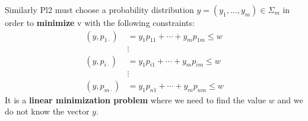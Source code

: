 \documentclass[../main.tex]{subfiles}
\begin{document}
Similarly Pl2 must choose a probability distribution $y = (y_1, \ldots, y_m) \in \Sigma_m$ in order to \textbf{minimize} v with the following constraints:
\begin{align*}
    (y, p_{1 \cdot}) & = y_1 p_{11} + \cdots + y_m p_{1m} \leq w \\
                     & \vdots                                    \\
    (y, p_{i \cdot}) & = y_1 p_{i1} + \cdots + y_m p_{im} \leq w \\
                     & \vdots                                    \\
    (y, p_{m \cdot}) & = y_1 p_{n1} + \cdots + y_m p_{nm} \leq w
\end{align*}
It is a \textbf{linear minimization problem} where we need to find the value $w$ and we do not know the vector $y$.
\end{document}
